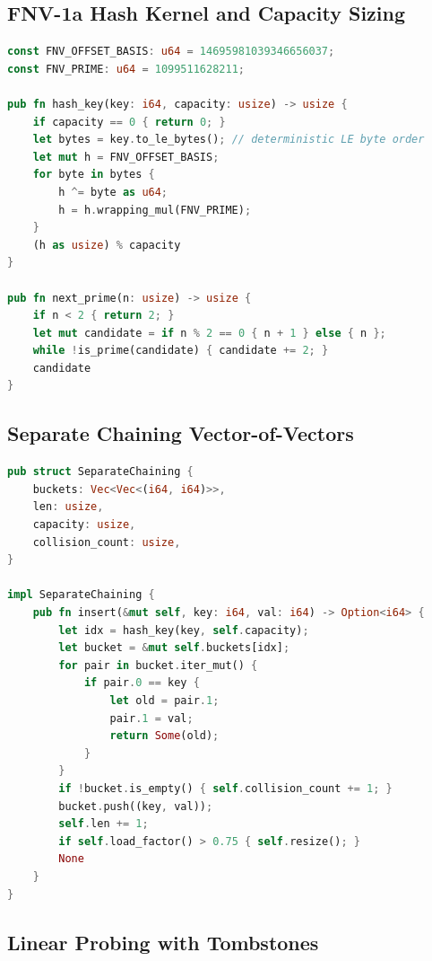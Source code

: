 \documentclass[conference]{IEEEtran}
\begin{document}
\subsection{FNV-1a Hash Kernel and Capacity Sizing}

\begin{lstlisting}[language=Rust]
const FNV_OFFSET_BASIS: u64 = 14695981039346656037;
const FNV_PRIME: u64 = 1099511628211;

pub fn hash_key(key: i64, capacity: usize) -> usize {
    if capacity == 0 { return 0; }
    let bytes = key.to_le_bytes(); // deterministic LE byte order
    let mut h = FNV_OFFSET_BASIS;
    for byte in bytes {
        h ^= byte as u64;
        h = h.wrapping_mul(FNV_PRIME);
    }
    (h as usize) % capacity
}

pub fn next_prime(n: usize) -> usize {
    if n < 2 { return 2; }
    let mut candidate = if n % 2 == 0 { n + 1 } else { n };
    while !is_prime(candidate) { candidate += 2; }
    candidate
}
\end{lstlisting}

\subsection{Separate Chaining Vector-of-Vectors}

\begin{lstlisting}[language=Rust]
pub struct SeparateChaining {
    buckets: Vec<Vec<(i64, i64)>>,
    len: usize,
    capacity: usize,
    collision_count: usize,
}

impl SeparateChaining {
    pub fn insert(&mut self, key: i64, val: i64) -> Option<i64> {
        let idx = hash_key(key, self.capacity);
        let bucket = &mut self.buckets[idx];
        for pair in bucket.iter_mut() {
            if pair.0 == key {
                let old = pair.1;
                pair.1 = val;
                return Some(old);
            }
        }
        if !bucket.is_empty() { self.collision_count += 1; }
        bucket.push((key, val));
        self.len += 1;
        if self.load_factor() > 0.75 { self.resize(); }
        None
    }
}
\end{lstlisting}

\subsection{Linear Probing with Tombstones}
\end{document}
